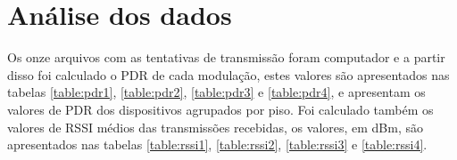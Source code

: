 \section{Análise dos dados}


Os onze arquivos com as tentativas de transmissão foram computador e a partir disso foi calculado o PDR de cada modulação, estes valores são apresentados nas tabelas \ref{table:pdr1}, \ref{table:pdr2}, \ref{table:pdr3} e \ref{table:pdr4}, e apresentam os valores de PDR dos dispositivos agrupados por piso. Foi calculado também os valores de RSSI médios das transmissões recebidas, os valores, em dBm, são apresentados nas tabelas \ref{table:rssi1}, \ref{table:rssi2}, \ref{table:rssi3} e \ref{table:rssi4}.

